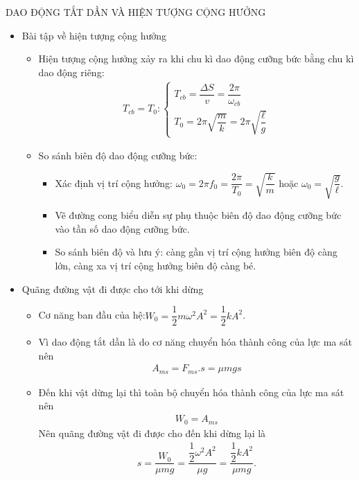 \begin{dang}{DAO ĐỘNG TẮT DẦN VÀ HIỆN TƯỢNG CỘNG HƯỞNG}
\begin{itemize}
\item Bài tập về hiện tượng cộng hưởng
\begin{itemize}
\item Hiện tượng cộng hưởng xảy ra khi chu kì dao động cưỡng bức bằng chu kì dao động riêng:  
\begin{align*}
T_{cb}=T_0: \begin{cases}
T_{cb}=\dfrac{\Delta S}{v}=\dfrac{2\pi}{\omega_{cb}}\\
T_0=2\pi \sqrt{\dfrac{m}{k}}=2\pi \sqrt{\dfrac{\ell}{g}}
\end{cases}
\end{align*}
\item So sánh biên độ dao động cưỡng bức:
\begin{itemize}
\item  Xác định vị trí cộng hưởng:
$\omega_0=2\pi f_0=\dfrac{2\pi}{T_0}=\sqrt{\dfrac{k}{m}}$ hoặc $\omega_0=\sqrt{\dfrac{g}{\ell}}$.
\item  Vẽ đường cong biểu diễn sự phụ thuộc biên độ dao động cưỡng bức vào tần số dao động cưỡng bức.
\item  So sánh biên độ và lưu ý: càng gần vị trí cộng hưởng biên độ càng lớn, càng xa vị trí cộng hưởng biên độ càng bé. 
\end{itemize}
\end{itemize}
\end{itemize}

\begin{itemize}
\item Quãng đường vật đi được cho tới khi dừng
\begin{itemize}
\item Cơ năng ban đầu của hệ:$W_0=\dfrac{1}{2}m\omega^2 A^2=\dfrac{1}{2}kA^2$.
\item Vì dao động tắt dần là do cơ năng chuyển hóa thành công của lực ma sát nên 
\begin{align*}
A_{ms}=F_{ms}.s=\mu mgs
\end{align*}
\item Đến khi vật dừng lại thì toàn bộ   chuyển hóa thành công của lực ma sát nên 
\begin{align*}
W_0=A_{ms}
\end{align*}
Nên quãng đường vật đi được cho đến khi dừng lại là
\begin{align*}
s=\dfrac{W_0}{\mu mg}=\dfrac{\dfrac{1}{2}\omega^2A^2}{\mu g}=\dfrac{\dfrac{1}{2}kA^2}{\mu mg}.
\end{align*}
\end{itemize}
\end{itemize}
\end{dang}

